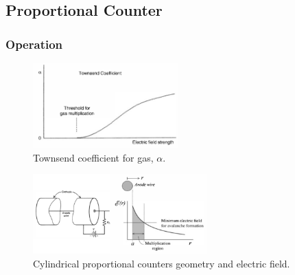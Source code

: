 \subsection{Proportional Counter}
\subsubsection{Operation}
\begin{figure}[ht]
    \centering
    \includegraphics[width=0.5\textwidth]{images/townsend_coefficient.png}
    \caption{Townsend coefficient for gas, $\alpha$.}
    \label{fig:townsend_coefficient}
\end{figure}
\begin{figure}[ht]
    \centering
    \includegraphics[width=0.6\textwidth]{images/Cylindrical_prop_counter.png}
    \caption{Cylindrical proportional counters geometry and electric field.}
    \label{fig:Cylindrical_prop_counter}
\end{figure}
